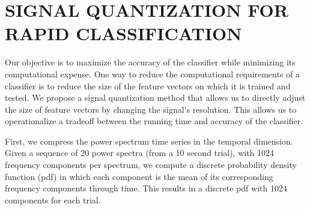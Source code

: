 
\section{\uppercase{Signal Quantization For Rapid Classification}}
\label{sec:quantization}


\noindent Our objective is to maximize the accuracy of the classifier while minimizing its computational expense. One way to reduce the computational requirements of a classifier is to reduce the size of the feature vectors on which it is trained and tested. We propose a signal quantization method that allows us to directly adjust the size of feature vectors by changing the signal's resolution. This allows us to operationalize a tradeoff between the running time and accuracy of the classifier.



First, we compress the power spectrum time series in the temporal dimension. Given a sequence of 20 power spectra (from a 10 second trial), with 1024 frequency components per spectrum, we compute a discrete probability density function (pdf) in which each component is the mean of its corresponding frequency components through time. This results in a discrete pdf with 1024 components for each trial.


